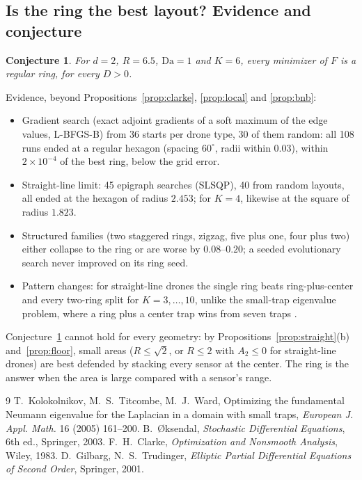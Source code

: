 \documentclass[11pt]{article}
\newtheorem{conjecture}[theorem]{Conjecture}
\theoremstyle{remark}
\newcommand{\Da}{\mathrm{Da}}
\begin{document}
\subsection{Is the ring the best layout? Evidence and conjecture}
\begin{conjecture}\label{conj:ring}
For $d=2$, $R=6.5$, $\Da=1$ and $K=6$, every minimizer of $F$ is a regular ring, for every
$D>0$.
\end{conjecture}
\noindent Evidence, beyond Propositions~\ref{prop:clarke}, \ref{prop:local} and
\ref{prop:bnb}:
\begin{itemize}[nosep]
\item Gradient search (exact adjoint gradients of a soft maximum of the edge values,
L-BFGS-B) from 36 starts per drone type, 30 of them random: all 108 runs ended at a regular
hexagon (spacing $60^\circ$, radii within $0.03$), within $2\times10^{-4}$ of the best ring,
below the grid error.
\item Straight-line limit: 45 epigraph searches (SLSQP), 40 from random layouts, all ended at
the hexagon of radius $2.453$; for $K=4$, likewise at the square of radius $1.823$.
\item Structured families (two staggered rings, zigzag, five plus one, four plus two) either
collapse to the ring or are worse by $0.08$--$0.20$; a seeded evolutionary search never
improved on its ring seed.
\item Pattern changes: for straight-line drones the single ring beats ring-plus-center and
every two-ring split for $K=3,\dots,10$, unlike the small-trap eigenvalue problem, where a
ring plus a center trap wins from seven traps \cite{KTW05}.
\end{itemize}
Conjecture~\ref{conj:ring} cannot hold for every geometry: by
Propositions~\ref{prop:straight}(b) and~\ref{prop:floor}, small areas ($R\le\sqrt2$, or
$R\le2$ with $A_2\le0$ for straight-line drones) are best defended by stacking every sensor at
the center. The ring is the answer when the area is large compared with a sensor's range.

\begin{thebibliography}{9}
 T.~Kolokolnikov, M.~S.~Titcombe, M.~J.~Ward, Optimizing the fundamental
Neumann eigenvalue for the Laplacian in a domain with small traps, \emph{European J. Appl.
Math.} 16 (2005) 161--200.
 B.~{\O}ksendal, \emph{Stochastic Differential Equations}, 6th ed., Springer,
2003.
 F.~H.~Clarke, \emph{Optimization and Nonsmooth Analysis}, Wiley, 1983.
 D.~Gilbarg, N.~S.~Trudinger, \emph{Elliptic Partial Differential Equations of
Second Order}, Springer, 2001.
\end{thebibliography}
\end{document}
